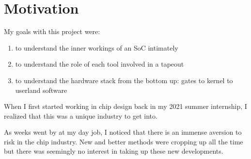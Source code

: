 \section{Motivation}

My goals with this project were:

\begin{enumerate}
	\item to understand the inner workings of an SoC intimately
	\item to understand the role of each tool involved in a tapeout
	\item to understand the hardware stack from the bottom up: gates to kernel to userland software
\end{enumerate}

When I first started working in chip design back in my 2021 summer internship, I realized that this was a unique industry to get into. 

As weeks went by at my day job, I noticed that there is an immense aversion to risk in the chip industry. New and better methods were cropping up all the time but there was seemingly no interest in taking up these new developments. 